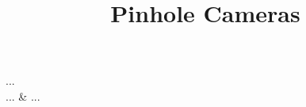 \documentclass[draft]{article}
\title{Pinhole Cameras}
\begin{document}
\begin{equipment}
    ... \\
    ... & ...
\end{equipment}    
\end{document}
